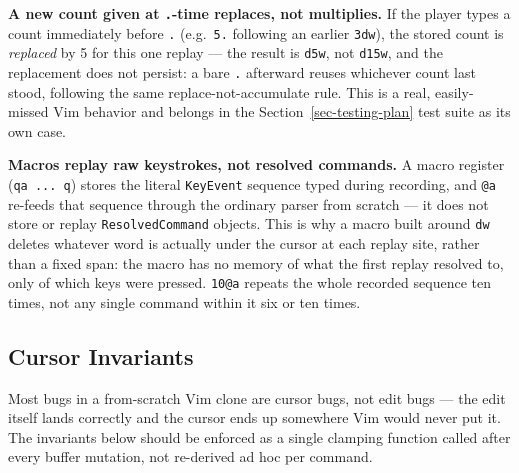 \documentclass[11pt]{article}
\begin{document}
\textbf{A new count given at \texttt{.}-time replaces, not multiplies.} If the player
types a count immediately before \texttt{.} (e.g.~\texttt{5.} following an earlier \texttt{3dw}),
the stored count is \emph{replaced} by 5 for this one replay --- the result is
\texttt{d5w}, not \texttt{d15w}, and the replacement does not persist: a bare \texttt{.}
afterward reuses whichever count last stood, following the same
replace-not-accumulate rule. This is a real, easily-missed Vim behavior and
belongs in the Section~\ref{sec-testing-plan} test suite as its own case.

\textbf{Macros replay raw keystrokes, not resolved commands.} A macro register
(\texttt{qa\ ...\ q}) stores the literal \texttt{KeyEvent} sequence typed during recording,
and \texttt{@a} re-feeds that sequence through the ordinary parser from scratch ---
it does not store or replay \texttt{ResolvedCommand} objects. This is why a macro
built around \texttt{dw} deletes whatever word is actually under the cursor at each
replay site, rather than a fixed span: the macro has no memory of what the
first replay resolved to, only of which keys were pressed. \texttt{10@a} repeats
the whole recorded sequence ten times, not any single command within it six
or ten times.

\hypertarget{sec-cursor-invariants}{%
\subsection{Cursor Invariants}\label{sec-cursor-invariants}}

Most bugs in a from-scratch Vim clone are cursor bugs, not edit bugs --- the
edit itself lands correctly and the cursor ends up somewhere Vim would never
put it. The invariants below should be enforced as a single clamping
function called after every buffer mutation, not re-derived ad hoc per
command.
\end{document}
